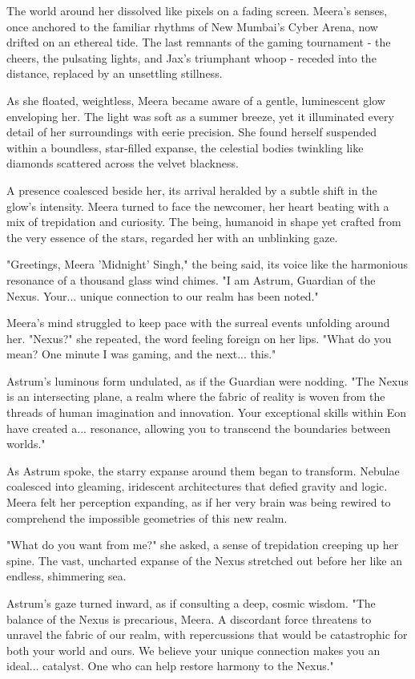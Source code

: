 \documentclass[12pt]{report}  %
\begin{document}
The world around her dissolved like pixels on a fading screen. Meera's
senses, once anchored to the familiar rhythms of New Mumbai's Cyber
Arena, now drifted on an ethereal tide. The last remnants of the gaming
tournament - the cheers, the pulsating lights, and Jax's triumphant
whoop - receded into the distance, replaced by an unsettling stillness.

As she floated, weightless, Meera became aware of a gentle, luminescent
glow enveloping her. The light was soft as a summer breeze, yet it
illuminated every detail of her surroundings with eerie precision. She
found herself suspended within a boundless, star-filled expanse, the
celestial bodies twinkling like diamonds scattered across the velvet
blackness.

A presence coalesced beside her, its arrival heralded by a subtle shift
in the glow's intensity. Meera turned to face the newcomer, her heart
beating with a mix of trepidation and curiosity. The being, humanoid in
shape yet crafted from the very essence of the stars, regarded her with
an unblinking gaze.

"Greetings, Meera 'Midnight' Singh," the being said, its voice like the
harmonious resonance of a thousand glass wind chimes. "I am Astrum,
Guardian of the Nexus. Your... unique connection to our realm has been
noted."

Meera's mind struggled to keep pace with the surreal events unfolding
around her. "Nexus?" she repeated, the word feeling foreign on her lips.
"What do you mean? One minute I was gaming, and the next... this."

Astrum's luminous form undulated, as if the Guardian were nodding. "The
Nexus is an intersecting plane, a realm where the fabric of reality is
woven from the threads of human imagination and innovation. Your
exceptional skills within Eon have created a... resonance, allowing you
to transcend the boundaries between worlds."

As Astrum spoke, the starry expanse around them began to transform.
Nebulae coalesced into gleaming, iridescent architectures that defied
gravity and logic. Meera felt her perception expanding, as if her very
brain was being rewired to comprehend the impossible geometries of this
new realm.

"What do you want from me?" she asked, a sense of trepidation creeping
up her spine. The vast, uncharted expanse of the Nexus stretched out
before her like an endless, shimmering sea.

Astrum's gaze turned inward, as if consulting a deep, cosmic wisdom.
"The balance of the Nexus is precarious, Meera. A discordant force
threatens to unravel the fabric of our realm, with repercussions that
would be catastrophic for both your world and ours. We believe your
unique connection makes you an ideal... catalyst. One who can help
restore harmony to the Nexus."
\end{document}
